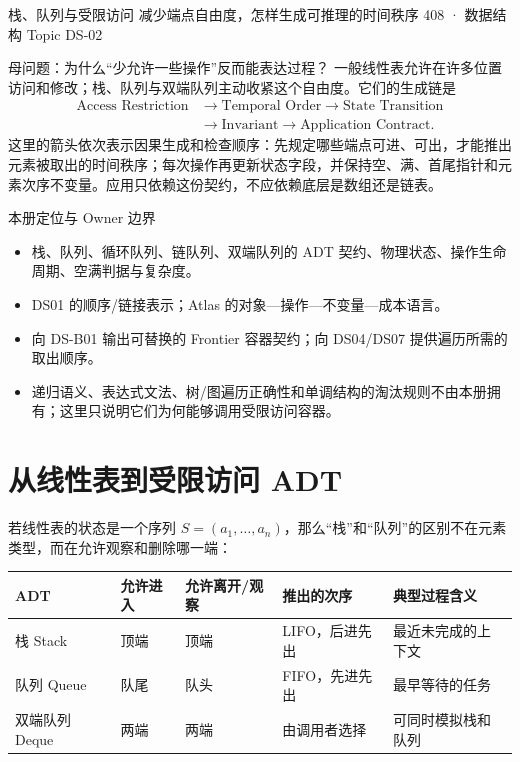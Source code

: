 \documentclass[UTF8,fontset=none,11pt,a4paper]{ctexart}
\begin{document}
\handbooktitle
  {栈、队列与受限访问}
  {减少端点自由度，怎样生成可推理的时间秩序}
  {408 · 数据结构 Topic DS-02}

\begin{corebox}{母问题：为什么“少允许一些操作”反而能表达过程？}
一般线性表允许在许多位置访问和修改；栈、队列与双端队列主动收紧这个自由度。它们的生成链是
\[
\begin{aligned}
\text{Access Restriction}&\to\text{Temporal Order}\to\text{State Transition}\\
&\to\text{Invariant}\to\text{Application Contract}.
\end{aligned}
\]
这里的箭头依次表示因果生成和检查顺序：先规定哪些端点可进、可出，才能推出元素被取出的时间秩序；每次操作再更新状态字段，并保持空、满、首尾指针和元素次序不变量。应用只依赖这份契约，不应依赖底层是数组还是链表。
\end{corebox}

\begin{methodbox}{本册定位与 Owner 边界}
\begin{itemize}
\item {}栈、队列、循环队列、链队列、双端队列的 ADT 契约、物理状态、操作生命周期、空满判据与复杂度。
\item {}DS01 的顺序/链接表示；Atlas 的对象—操作—不变量—成本语言。
\item {}向 DS-B01 输出可替换的 Frontier 容器契约；向 DS04/DS07 提供遍历所需的取出顺序。
\item {}递归语义、表达式文法、树/图遍历正确性和单调结构的淘汰规则不由本册拥有；这里只说明它们为何能够调用受限访问容器。
\end{itemize}
\end{methodbox}

\tableofcontents\newpage

\section{从线性表到受限访问 ADT}
若线性表的状态是一个序列 $S=(a_1,\ldots,a_n)$，那么“栈”和“队列”的区别不在元素类型，而在允许观察和删除哪一端：
\begin{center}\small
\begin{tabularx}{\linewidth}{L{2.2cm}L{2.4cm}L{2.4cm}YY}
\toprule
ADT & 允许进入 & 允许离开/观察 & 推出的次序 & 典型过程含义\\
\midrule
栈 Stack & 顶端 & 顶端 & LIFO，后进先出 & 最近未完成的上下文\\
队列 Queue & 队尾 & 队头 & FIFO，先进先出 & 最早等待的任务\\
双端队列 Deque & 两端 & 两端 & 由调用者选择 & 可同时模拟栈和队列\\
\bottomrule
\end{tabularx}
\end{center}
\end{document}
